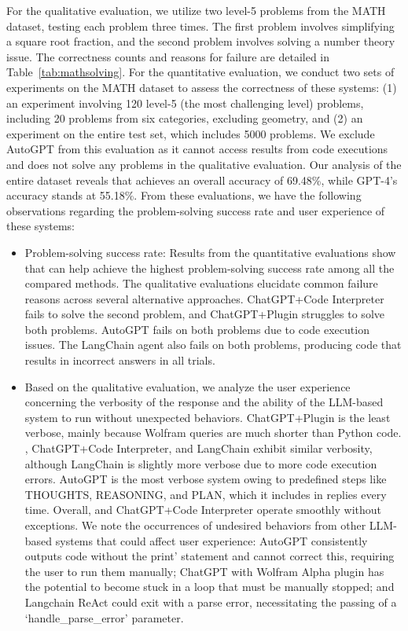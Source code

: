 For the qualitative evaluation, we utilize two level-5 problems from the MATH dataset, testing each problem three times. The first problem involves simplifying a square root fraction, and the second problem involves solving a number theory issue.  The correctness counts and reasons for failure are detailed in Table~\ref{tab:mathsolving}. For the quantitative evaluation, we conduct two sets of experiments on the MATH dataset to assess the correctness of these systems: (1) an experiment involving 120 level-5 (the most challenging level) problems, including 20 problems from six categories, excluding geometry, and (2) an experiment on the entire test set, which includes 5000 problems. We exclude AutoGPT from this evaluation as it cannot access results from code executions and does not solve any problems in the qualitative evaluation. Our analysis of the entire dataset reveals that \libName achieves an overall accuracy of 69.48\%, while GPT-4's accuracy stands at 55.18\%. From these evaluations, we have the following observations regarding the problem-solving success rate and user experience of these systems:
\begin{itemize}[leftmargin=*]
    \vspace{-1mm}
    \setlength\itemsep{-0.1em}
    \item Problem-solving success rate: Results from the quantitative evaluations show that \libName can help achieve the highest problem-solving success rate among all the compared methods. The qualitative evaluations elucidate common failure reasons across several alternative approaches.  ChatGPT+Code Interpreter fails to solve the second problem, and ChatGPT+Plugin struggles to solve both problems. AutoGPT fails on both problems due to code execution issues. The LangChain agent also fails on both problems, producing code that results in incorrect answers in all trials.
    \item Based on the qualitative evaluation, we analyze the user experience concerning the verbosity of the response and the ability of the LLM-based system to run without unexpected behaviors. ChatGPT+Plugin is the least verbose, mainly because Wolfram queries are much shorter than Python code. \libName, ChatGPT+Code Interpreter, and LangChain exhibit similar verbosity, although LangChain is slightly more verbose due to more code execution errors. AutoGPT is the most verbose system owing to predefined steps like THOUGHTS, REASONING, and PLAN, which it includes in replies every time.  Overall, \libName and ChatGPT+Code Interpreter operate smoothly without exceptions.  We note the occurrences of undesired behaviors from other LLM-based systems that could affect user experience:  AutoGPT consistently outputs code without the print' statement and cannot correct this, requiring the user to run them manually; ChatGPT with Wolfram Alpha plugin has the potential to become stuck in a loop that must be manually stopped; and Langchain ReAct could exit with a parse error, necessitating the passing of a `handle\_parse\_error' parameter.
\end{itemize}


